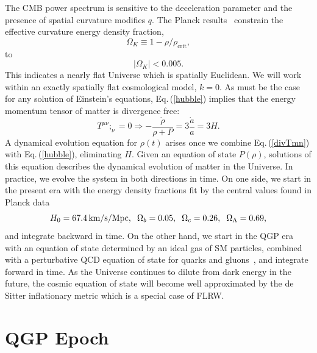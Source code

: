 \documentclass[universe,article,submit,moreauthors,pdftex,a4paper]{Definitions/mdpi}
\newcommand{\beqn}{\begin{equation}}
\newcommand{\eeqn}{\end{equation}}
\newcommand{\req}[1]{Eq.\,(\ref{#1})}
\begin{document}
The CMB power spectrum is sensitive to the deceleration parameter and the presence of spatial curvature modifies $q$. The Planck results~\cite{Planck:2013pxb,Planck:2015fie,Planck:2018vyg} constrain the effective curvature energy density fraction,
\begin{equation}
\Omega_K\equiv1-\rho/\rho_{\text{crit}},
\end{equation}
to
\begin{equation}
|\Omega_K|<0.005.
\end{equation}
This indicates a nearly flat Universe which is spatially Euclidean. We will work within an exactly spatially flat cosmological model, $k=0$. 
As must be the case for any solution of Einstein's equations, \req{hubble} implies that the energy momentum tensor of matter is divergence free:
\beqn\label{divTmn}
T^{\mu\nu};_\nu =0 \Rightarrow -\frac{\dot\rho}{\rho+P}=3\frac{\dot a}{a}=3H.
\eeqn
A dynamical evolution equation for $\rho(t)$ arises once we combine \req{divTmn} with \req{hubble}, eliminating $H$. Given an equation of state $P(\rho)$, solutions of this equation describes the dynamical evolution of matter in the Universe. In practice, we evolve the system in both directions in time. On one side, we start in the present era with the energy density fractions fit by the central values found in Planck data~\cite{Planck:2013pxb}
\begin{equation}\label{Planck_params}
H_0=67.4\,\text{km/s/Mpc},\hspace{2mm} \Omega_b=0.05,\hspace{2mm} \Omega_c=0.26, \hspace{2mm}\Omega_\Lambda=0.69,
\end{equation}
and integrate backward in time. On the other hand, we start in the QGP era with an equation of state determined by an ideal gas of SM particles, combined with a perturbative QCD equation of state for quarks and gluons~\cite{Borsanyi:2013bia}, and integrate forward in time. As the Universe continues to dilute from dark energy in the future, the cosmic equation of state will become well approximated by the de Sitter inflationary metric which is a special case of FLRW.

\section{QGP Epoch}\label{sec:QGP}
\end{document}
